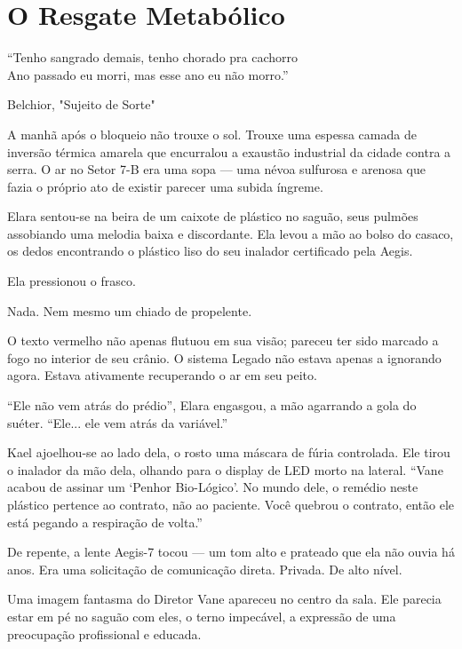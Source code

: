 
\chapter{O Resgate Metabólico}
\epigraph{``Tenho sangrado demais, tenho chorado pra cachorro \\ Ano passado eu morri, mas esse ano eu não morro.''}{Belchior, "Sujeito de Sorte"}

A manhã após o bloqueio não trouxe o sol. Trouxe uma espessa camada de inversão térmica amarela que encurralou a exaustão industrial da cidade contra a serra. O ar no Setor 7-B era uma sopa --- uma névoa sulfurosa e arenosa que fazia o próprio ato de existir parecer uma subida íngreme.

Elara sentou-se na beira de um caixote de plástico no saguão, seus pulmões assobiando uma melodia baixa e discordante. Ela levou a mão ao bolso do casaco, os dedos encontrando o plástico liso do seu inalador certificado pela Aegis.

Ela pressionou o frasco.

Nada. Nem mesmo um chiado de propelente.


O texto vermelho não apenas flutuou em sua visão; pareceu ter sido marcado a fogo no interior de seu crânio. O sistema Legado não estava apenas a ignorando agora. Estava ativamente recuperando o ar em seu peito.

``Ele não vem atrás do prédio'', Elara engasgou, a mão agarrando a gola do suéter. ``Ele... ele vem atrás da variável.''

Kael ajoelhou-se ao lado dela, o rosto uma máscara de fúria controlada. Ele tirou o inalador da mão dela, olhando para o display de LED morto na lateral. ``Vane acabou de assinar um `Penhor Bio-Lógico'. No mundo dele, o remédio neste plástico pertence ao contrato, não ao paciente. Você quebrou o contrato, então ele está pegando a respiração de volta.''

De repente, a lente Aegis-7 tocou --- um tom alto e prateado que ela não ouvia há anos. Era uma solicitação de comunicação direta. Privada. De alto nível.

Uma imagem fantasma do Diretor Vane apareceu no centro da sala. Ele parecia estar em pé no saguão com eles, o terno impecável, a expressão de uma preocupação profissional e educada.

